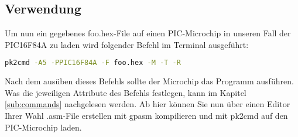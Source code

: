 \subsection{Verwendung}
\label{sub:howToUse}
Um nun ein gegebenes {\ttfamily foo.hex}-File auf einen PIC-Microchip in unseren Fall der PIC16F84A zu laden wird folgender Befehl im Terminal ausgeführt:
\begin{lstlisting}[language=bash]
                pk2cmd -A5 -PPIC16F84A -F foo.hex -M -T -R
\end{lstlisting}
Nach dem ausüben dieses Befehls sollte der Microchip das Programm ausführen. Was die jeweiligen Attribute des Befehls festlegen, kann im Kapitel \ref{sub:commands} nachgelesen werden. Ab hier können Sie nun über einen Editor Ihrer Wahl {\ttfamily .asm}-File erstellen mit {\ttfamily gpasm} kompilieren und mit {\ttfamily pk2cmd} auf den PIC-Microchip laden.